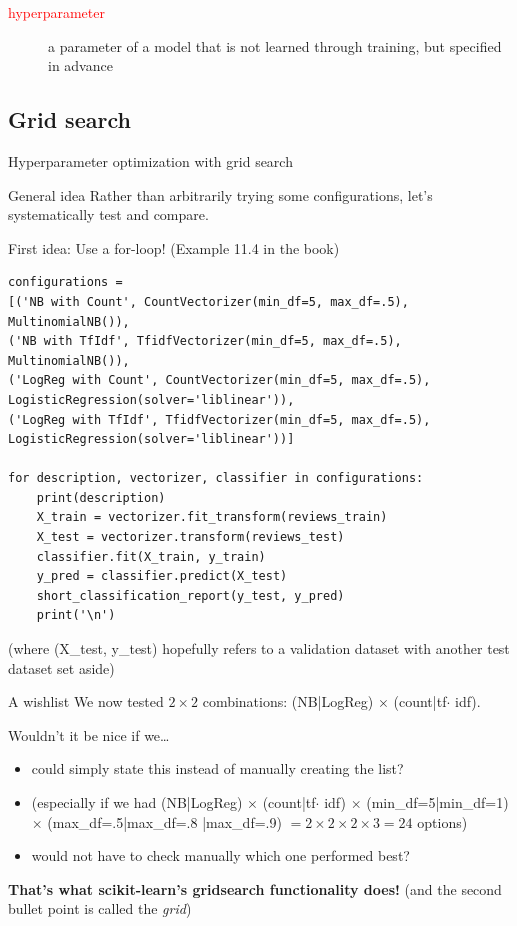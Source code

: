 \documentclass[compress]{beamer}
\begin{document}
\begin{frame}[plain]
\centering
	\begin{description}
		\item[\textcolor{red}{hyperparameter}] a parameter of a model that is not learned through training, but specified in advance
	\end{description}
	
\end{frame}



\subsection{Grid search}

\begin{frame}{Hyperparameter optimization with grid search}
\begin{block}{General idea}
	Rather than arbitrarily trying some configurations, let's systematically test and compare.
\end{block}
First idea: Use a for-loop! (Example 11.4 in the book)
\end{frame}

\begin{frame}
	\small
\begin{lstlisting}
configurations = 
[('NB with Count', CountVectorizer(min_df=5, max_df=.5), MultinomialNB()),
('NB with TfIdf', TfidfVectorizer(min_df=5, max_df=.5), MultinomialNB()),
('LogReg with Count', CountVectorizer(min_df=5, max_df=.5), LogisticRegression(solver='liblinear')),
('LogReg with TfIdf', TfidfVectorizer(min_df=5, max_df=.5), LogisticRegression(solver='liblinear'))]

for description, vectorizer, classifier in configurations:
    print(description)
    X_train = vectorizer.fit_transform(reviews_train)
    X_test = vectorizer.transform(reviews_test)
    classifier.fit(X_train, y_train)
    y_pred = classifier.predict(X_test)
    short_classification_report(y_test, y_pred)
    print('\n')
\end{lstlisting}
(where (X\_test, y\_test) hopefully refers to a validation dataset with another test dataset set aside) 
\end{frame}


\begin{frame}{A wishlist}
We now tested $2\times 2$ combinations: (NB|LogReg) $\times$ (count|tf$\cdot$ idf).

	Wouldn't it be nice if we\ldots
\begin{itemize}[<+->]
	\item could simply state this instead of manually creating the list?
	\item (especially if we had  (NB|LogReg) $\times$ (count|tf$\cdot$ idf)  $\times$ (min\_df=5|min\_df=1)  $\times$ (max\_df=.5|max\_df=.8 |max\_df=.9)  $= 2\times 2\times 2\times 3 = 24$ options)
	\item would not have to check manually which one performed best?
\end{itemize}
\pause
\textbf{That's what scikit-learn's gridsearch functionality does!} (and the second bullet point is called the \textit{grid})
\end{frame}
\end{document}
